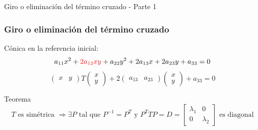 \documentclass[xcolor={dvipsnames},aspectratio=169,10pt]{beamer}
\begin{document}
\begin{frame}{Giro o eliminación del término cruzado - Parte 1}
  \frametitle{Giro o eliminación del término cruzado}
  Cónica en la referencia inicial:
  \begin{equation*}
    a_{11}x^2 + \textcolor{red}{2a_{12}xy} + a_{22}y^2 + 2a_{13}x + 2a_{23}y + a_{33} = 0
  \end{equation*}
  \begin{equation*}
    \begin{pmatrix} x & y \end{pmatrix} T \begin{pmatrix} x \\ y \end{pmatrix} + 2\begin{pmatrix} a_{13} & a_{23} \end{pmatrix} \begin{pmatrix} x \\ y \end{pmatrix} + a_{33} = 0
  \end{equation*}
  
  \begin{block}{Teorema}
    \begin{equation*}
      T \text{ es simétrica } \Rightarrow \exists P \text{ tal que } P^{-1} = P^T \text{ y } P^T T P = D = \begin{bmatrix} \lambda_1 & 0 \\ 0 & \lambda_2 \end{bmatrix} \text{ es diagonal}    
    \end{equation*}
  \end{block}
\end{frame}
\end{document}
